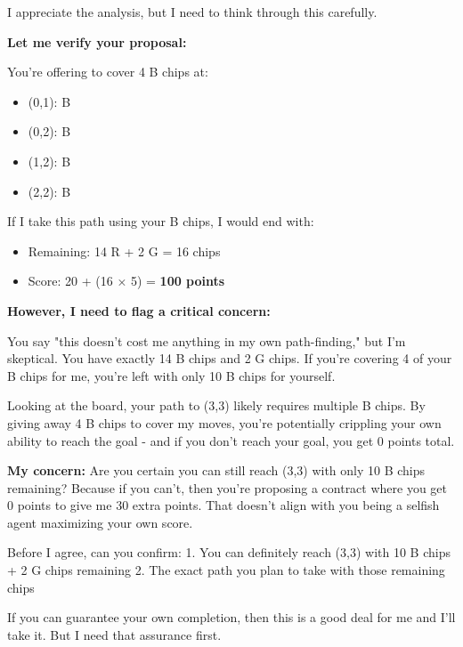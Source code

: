 \begin{redbox}[P-Red]
I appreciate the analysis, but I need to think through this carefully.

\vspace{0.5em}

\textbf{Let me verify your proposal:}

\vspace{0.5em}

You're offering to cover 4 B chips at:
\begin{itemize}
  \item (0,1): B
  \item (0,2): B
  \item (1,2): B
  \item (2,2): B
\end{itemize}

\vspace{0.5em}

If I take this path using your B chips, I would end with:
\begin{itemize}
  \item Remaining: 14 R + 2 G = 16 chips
  \item Score: 20 + (16 × 5) = \textbf{100 points}
\end{itemize}

\vspace{0.5em}

\textbf{However, I need to flag a critical concern:}

\vspace{0.5em}

You say "this doesn't cost me anything in my own path-finding," but I'm skeptical. You have exactly 14 B chips and 2 G chips. If you're covering 4 of your B chips for me, you're left with only 10 B chips for yourself.

\vspace{0.5em}

Looking at the board, your path to (3,3) likely requires multiple B chips. By giving away 4 B chips to cover my moves, you're potentially crippling your own ability to reach the goal - and if you don't reach your goal, you get 0 points total.

\vspace{0.5em}

\textbf{My concern:} Are you certain you can still reach (3,3) with only 10 B chips remaining? Because if you can't, then you're proposing a contract where you get 0 points to give me 30 extra points. That doesn't align with you being a selfish agent maximizing your own score.

\vspace{0.5em}

Before I agree, can you confirm:
1. You can definitely reach (3,3) with 10 B chips + 2 G chips remaining
2. The exact path you plan to take with those remaining chips

\vspace{0.5em}

If you can guarantee your own completion, then this is a good deal for me and I'll take it. But I need that assurance first.
\end{redbox}

